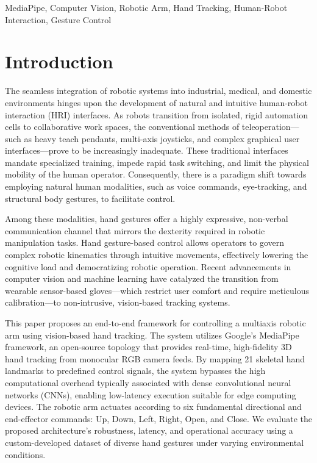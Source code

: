 \documentclass[conference]{IEEEtran}
\begin{document}
\begin{IEEEkeywords}
MediaPipe, Computer Vision, Robotic Arm, Hand Tracking, Human-Robot Interaction, Gesture Control
\end{IEEEkeywords}

\section{Introduction}
The seamless integration of robotic systems into industrial, medical, and domestic environments hinges upon the development of natural and intuitive human-robot interaction (HRI) interfaces. As robots transition from isolated, rigid automation cells to collaborative work spaces, the conventional methods of teleoperation---such as heavy teach pendants, multi-axis joysticks, and complex graphical user interfaces---prove to be increasingly inadequate. These traditional interfaces mandate specialized training, impede rapid task switching, and limit the physical mobility of the human operator. Consequently, there is a paradigm shift towards employing natural human modalities, such as voice commands, eye-tracking, and structural body gestures, to facilitate control.

Among these modalities, hand gestures offer a highly expressive, non-verbal communication channel that mirrors the dexterity required in robotic manipulation tasks. Hand gesture-based control allows operators to govern complex robotic kinematics through intuitive movements, effectively lowering the cognitive load and democratizing robotic operation. Recent advancements in computer vision and machine learning have catalyzed the transition from wearable sensor-based gloves---which restrict user comfort and require meticulous calibration---to non-intrusive, vision-based tracking systems.

This paper proposes an end-to-end framework for controlling a multiaxis robotic arm using vision-based hand tracking. The system utilizes Google's MediaPipe framework, an open-source topology that provides real-time, high-fidelity 3D hand tracking from monocular RGB camera feeds. By mapping 21 skeletal hand landmarks to predefined control signals, the system bypasses the high computational overhead typically associated with dense convolutional neural networks (CNNs), enabling low-latency execution suitable for edge computing devices. The robotic arm actuates according to six fundamental directional and end-effector commands: Up, Down, Left, Right, Open, and Close. We evaluate the proposed architecture's robustness, latency, and operational accuracy using a custom-developed dataset of diverse hand gestures under varying environmental conditions.
\end{document}
